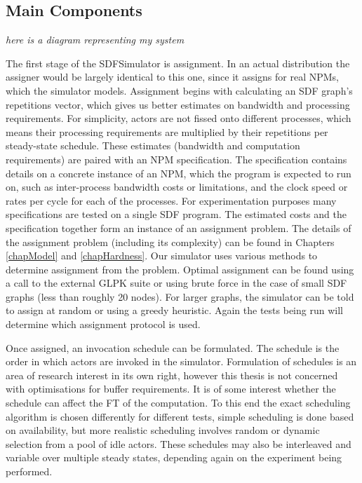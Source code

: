 \subsection{Main Components}
\label{secSystemComponents}

{\em here is a diagram representing my system}

The first stage of the SDFSimulator is assignment.
In an actual distribution the assigner would be largely identical to this one, since it assigns for real NPMs, which the simulator models.
Assignment begins with calculating an SDF graph's repetitions vector, which gives us better estimates on bandwidth and processing requirements.
For simplicity, actors are not fissed onto different processes, which means their processing requirements are multiplied by their repetitions per steady-state schedule.
These estimates (bandwidth and computation requirements) are paired with an NPM specification.
The specification contains details on a concrete instance of an NPM, which the program is expected to run on, such as inter-process bandwidth costs or limitations, and the clock speed or rates per cycle for each of the processes.
For experimentation purposes many specifications are tested on a single SDF program.
The estimated costs and the specification together form an instance of an assignment problem.
The details of the assignment problem (including its complexity) can be found in Chapters \ref{chapModel} and \ref{chapHardness}.
Our simulator uses various methods to determine assignment from the problem.
Optimal assignment can be found using a call to the external GLPK suite or using brute force in the case of small SDF graphs (less than roughly 20 nodes).
For larger graphs, the simulator can be told to assign at random or using a greedy heuristic.
Again the tests being run will determine which assignment protocol is used.

Once assigned, an invocation schedule can be formulated.
The schedule is the order in which actors are invoked in the simulator.
Formulation of schedules is an area of research interest in its own right, however this thesis is not concerned with optimisations for buffer requirements.
It is of some interest whether the schedule can affect the FT of the computation.
To this end the exact scheduling algorithm is chosen differently for different tests, simple scheduling is done based on availability, but more realistic scheduling involves random or dynamic selection from a pool of idle actors.
These schedules may also be interleaved and variable over multiple steady states, depending again on the experiment being performed.

